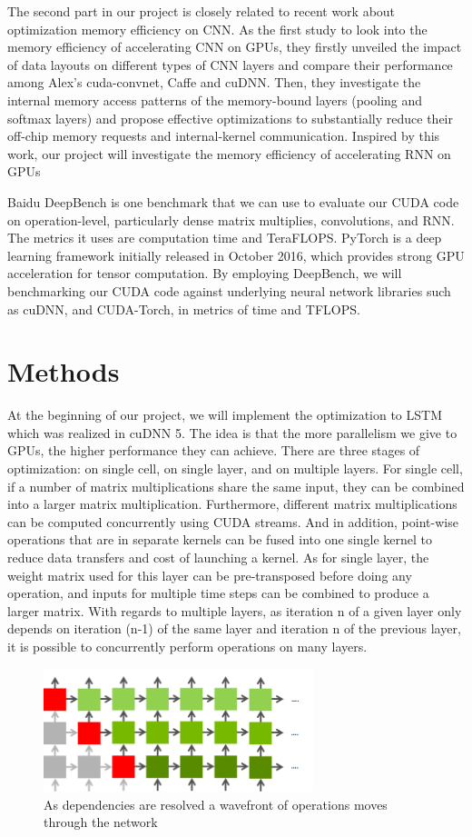 \documentclass{article}
\begin{document}
 The second part in our project is closely related to recent work about optimization memory efficiency on CNN\cite{li2016optimizing}. As the first study to look into the memory efficiency of accelerating CNN on GPUs, they firstly unveiled the impact of data layouts on different types of CNN layers and compare their performance among Alex’s cuda-convnet, Caffe and cuDNN. Then, they investigate the internal memory access patterns of the memory-bound layers (pooling and softmax layers) and propose effective optimizations to substantially reduce their off-chip memory requests and internal-kernel communication. Inspired by this work, our project will investigate the memory efficiency of accelerating RNN on GPUs

Baidu DeepBench\cite{DeepBench} is one benchmark that we can use to evaluate our CUDA code on operation-level, particularly dense matrix multiplies, convolutions, and RNN. The metrics it uses are computation time and TeraFLOPS. 
PyTorch\cite{PyTorch} is a deep learning framework initially released in October 2016, which provides strong GPU acceleration for tensor computation. 
By employing DeepBench, we will benchmarking our CUDA code against underlying neural network libraries such as cuDNN, and CUDA-Torch, in metrics of time and TFLOPS.

\section{Methods}

At the beginning of our project, we will implement the optimization to LSTM which was realized in cuDNN 5\cite{appleyard2016optimizing}. The idea is that the more parallelism we give to GPUs, the higher performance they can achieve. There are three stages of optimization: on single cell, on single layer, and on multiple layers. For single cell, if a number of matrix multiplications share the same input, they can be combined into a larger matrix multiplication. Furthermore, different matrix multiplications can be computed concurrently using CUDA streams. And in addition, point-wise operations that are in separate kernels can be fused into one single kernel to reduce data transfers and cost of launching a kernel. As for single layer, the weight matrix used for this layer can be pre-transposed before doing any operation, and inputs for multiple time steps can be combined to produce a larger matrix. With regards to multiple layers, as iteration n of a given layer only depends on iteration (n-1) of the same layer and iteration n of the previous layer, it is possible to concurrently perform operations on many layers.

\begin{figure}[h]
\centering
\includegraphics[width=0.7\textwidth]{layers}
\caption{As dependencies are resolved a wavefront of operations moves through the network\cite{optimizingRNN}}
\end{figure}

\medskip



\end{document}
